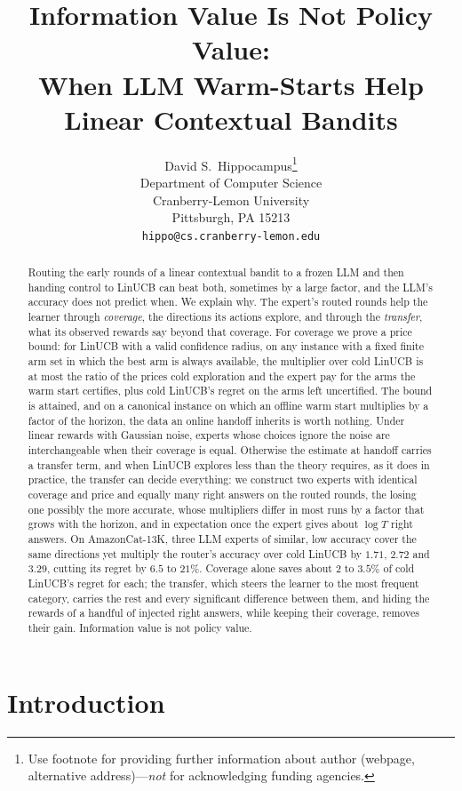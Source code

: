\documentclass{article}
\title{Information Value Is Not Policy Value:\\ When LLM Warm-Starts Help Linear Contextual Bandits}
\author{%
  David S.~Hippocampus\thanks{Use footnote for providing further information
    about author (webpage, alternative address)---\emph{not} for acknowledging
    funding agencies.} \\
  Department of Computer Science\\
  Cranberry-Lemon University\\
  Pittsburgh, PA 15213 \\
  \texttt{hippo@cs.cranberry-lemon.edu} \\
}
\theoremstyle{definition}
\theoremstyle{remark}
\theoremstyle{remark}
\begin{document}
\maketitle
\begin{abstract}
Routing the early rounds of a linear contextual bandit to a frozen LLM and
then handing control to LinUCB can beat both, sometimes by a large factor,
and the LLM's accuracy does not predict when. We explain why. The expert's
routed rounds help the learner through \emph{coverage}, the directions its
actions explore, and through the \emph{transfer}, what its observed rewards
say beyond that coverage. For coverage we prove a price bound: for LinUCB
with a valid confidence radius, on any instance with a fixed finite arm set in
which the best arm is always available, the multiplier over cold LinUCB is at
most the ratio of the prices cold exploration and the expert pay for the arms
the warm start certifies, plus cold LinUCB's regret on the arms left
uncertified. The bound is attained, and on a canonical instance on which an
offline warm start multiplies by a factor of the horizon, the data an online
handoff inherits is worth nothing. Under linear rewards with Gaussian noise,
experts whose choices ignore the noise are interchangeable when their
coverage is equal. Otherwise the estimate at handoff carries a transfer term,
and when LinUCB explores less than the theory requires, as it does in
practice, the transfer can decide everything: we construct two experts with
identical coverage and price and equally many right answers on the routed
rounds, the losing one possibly the more accurate, whose multipliers differ
in most runs by a factor that grows with the horizon, and in expectation once
the expert gives about $\log T$ right answers. On AmazonCat-13K, three LLM
experts of similar, low accuracy cover the same directions yet multiply the
router's accuracy over cold LinUCB by $1.71$, $2.72$ and $3.29$, cutting its
regret by $6.5$ to $21\%$. Coverage alone saves about $2$ to $3.5\%$ of
cold LinUCB's regret for each; the transfer, which steers the learner to the
most frequent category, carries the rest and every significant difference
between them, and hiding the rewards of a handful of injected right answers,
while keeping their coverage, removes their gain. Information value is not
policy value.
\end{abstract}


\section{Introduction}
\label{sec:intro}
\end{document}
